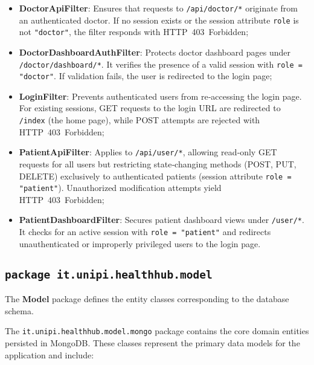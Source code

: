\begin{itemize}
	\item \textbf{DoctorApiFilter}:
	Ensures that requests to \texttt{/api/doctor/*} originate from an authenticated doctor. If no session exists or the session attribute \texttt{role} is not \texttt{"doctor"}, the filter responds with HTTP 403 Forbidden;
	
	\item \textbf{DoctorDashboardAuthFilter}:
	Protects doctor dashboard pages under \texttt{/doctor/dashboard/*}. It verifies the presence of a valid session with \texttt{role = "doctor"}. If validation fails, the user is redirected to the login page;
	
	\item \textbf{LoginFilter}: 
	Prevents authenticated users from re‐accessing the login page. For existing sessions, GET requests to the login URL are redirected to \texttt{/index} (the home page), while POST attempts are rejected with HTTP 403 Forbidden;
	
	\item \textbf{PatientApiFilter}:
	Applies to \texttt{/api/user/*}, allowing read‐only GET requests for all users but restricting state‐changing methods (POST, PUT, DELETE) exclusively to authenticated patients (session attribute \texttt{role = "patient"}). Unauthorized modification attempts yield HTTP 403 Forbidden;
	
	\item \textbf{PatientDashboardFilter}:
	Secures patient dashboard views under \texttt{/user/*}. It checks for an active session with \texttt{role = "patient"} and redirects unauthenticated or improperly privileged users to the login page.
\end{itemize}

\subsection{\texttt{package it.unipi.healthhub.model}}
The \textbf{Model} package defines the entity classes corresponding to the database schema.

The \texttt{it.unipi.healthhub.model.mongo} package contains the core domain entities persisted in MongoDB. These classes represent the primary data models for the application and include:

